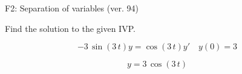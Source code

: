 \begin{exercise}
  \begin{exerciseTitle}F2: Separation of variables (ver. 94)\end{exerciseTitle}
  \begin{exerciseStatement}
    
Find the solution to the given IVP.

    
\[-3 \, \sin\left(3 \, t\right) y= \cos\left(3 \, t\right) y'\hspace{1em} y\left( 0 \right)= 3\]

  \end{exerciseStatement}
  \begin{exerciseAnswer}
    
\[y= 3 \, \cos\left(3 \, t\right)\]

  \end{exerciseAnswer}
\end{exercise}